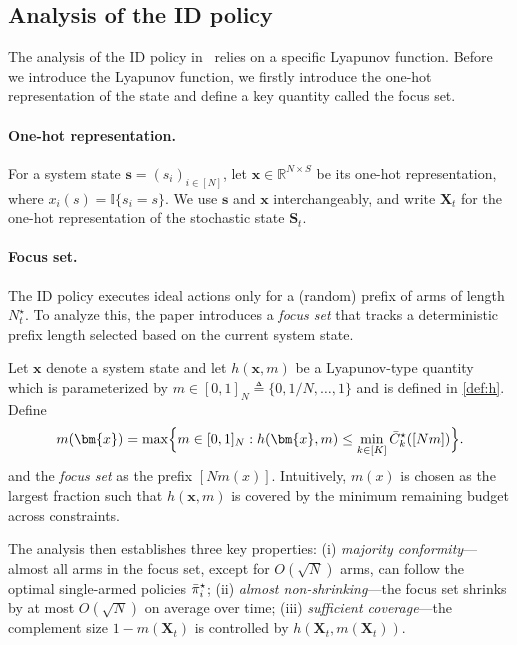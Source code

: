 \documentclass[mnsc,nonblindrev]{informs3}
\newcommand{\pibst}{\Bar{\pi}^\star}
\newcommand{\bms}{\bm{s}}
\newcommand{\bmx}{\bm{x}}
\begin{document}
\begin{APPENDICES}
\subsection{Analysis of the ID policy}
\label{subsec:id-analysis}

The analysis of the ID policy in~\citet{zhang2025projection} relies on a specific Lyapunov function. Before we introduce the Lyapunov function, we firstly introduce the one-hot representation of the state and define a key quantity called the focus set. 

\paragraph{One-hot representation.}
For a system state \(\bms=(s_i)_{i\in[N]}\), let
\(\bmx\in\mathbb R^{N\times S}\) be its one-hot representation, where
\(x_i(s)=\mathbb I\{s_i=s\}\). We use \(\bms\) and \(\bmx\)
interchangeably, and write \(\bm X_t\) for the one-hot representation of
the stochastic state \(\bm S_t\).

\paragraph{Focus set.}
The ID policy executes ideal actions only for a (random) prefix of arms of length $N_t^\star$.
To analyze this, the paper introduces a \emph{focus set} that tracks a deterministic prefix length selected based on the current system state.

Let $\bmx$ denote a system state and let $h(\bmx,m)$
be a Lyapunov-type quantity which is parameterized by $m\in[0,1]_N\triangleq\{0,1/N,\dots,1\}$ and is defined in \eqref{def:h}. Define
\begin{equation}\label{eq:def-m}
    m(\bmx)
    = \max\Bigl\{m \in [0,1]_N :h(\bmx,m)
    \le \min_{k\in[K]} \bar{C}_k^{\star}([Nm]) \Bigr\}.
\end{equation}
and the \emph{focus set} as the prefix $[Nm(x)]$.
Intuitively, $m(x)$ is chosen as the largest fraction such that 
$h(\bmx,m)$ is covered by the minimum remaining budget across constraints.

The analysis then establishes three key properties:
(i) \emph{majority conformity}---almost all arms in the focus set, except for $O(\sqrt{N})$ arms, can follow the optimal single-armed policies $\pibst_i$;
(ii) \emph{almost non-shrinking}---the focus set shrinks by at most $O(\sqrt{N})$ on average over time;
(iii) \emph{sufficient coverage}---the complement size $1-m(\bm{X}_t)$ is controlled by $h(\bm{X}_t,m(\bm{X}_t))$.


\end{APPENDICES}
\end{document}
